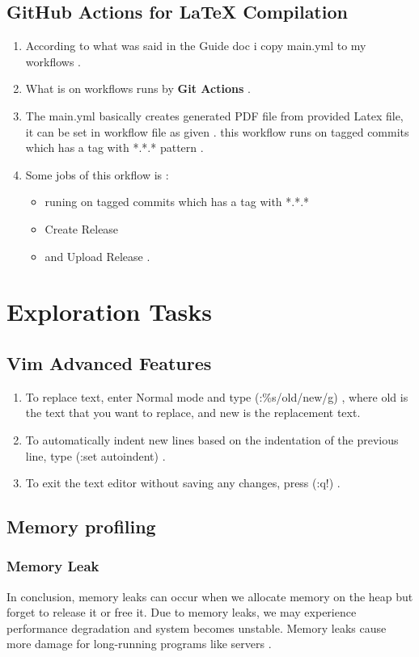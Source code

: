 \documentclass{article}
\begin{document}
\subsection{GitHub Actions for LaTeX Compilation}
\begin{enumerate}
    \item {According to what was said in the Guide doc i copy main.yml to my workflows .}
    \item {What is on workflows runs by \textbf{Git Actions} .}
    \item {The main.yml basically creates generated PDF file from provided Latex file, it can be set in workflow file as given . this workflow runs on tagged commits which has a tag with *.*.* pattern .}
    \item {Some jobs of this orkflow is :}
    	\begin{itemize}
    		\item{ runing on tagged commits which has a tag with *.*.* }
    		\item{Create Release }
    		\item{ and Upload Release .}
    	\end{itemize}
\end{enumerate}
\section{Exploration Tasks}
\subsection{Vim Advanced Features}
\begin{enumerate}
    \item{To replace text, enter Normal mode and type (:\%s/old/new/g) , where old is the text that you want to replace, and new is the replacement text.}
    \item{To automatically indent new lines based on the indentation of the previous line, type (:set autoindent) .}
    \item{To exit the text editor without saving any changes, press (:q!) .}
\end{enumerate}
\subsection{Memory profiling}
\subsubsection{Memory Leak}
In conclusion, memory leaks can occur when we allocate memory on the heap but forget to release it or free it. Due to memory leaks, we may experience performance degradation and system becomes unstable. Memory leaks cause more damage for long-running programs like servers .
\end{document}
